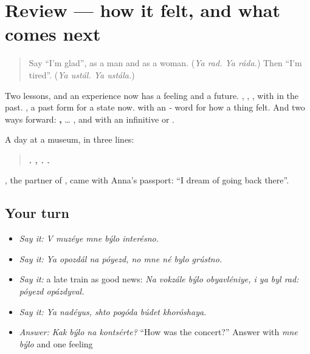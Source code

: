 \section[(review)]{Review — how it felt, and what comes next}

\label{lesson:RU-C267-review}



\begin{quote}
Say \textquotedblleft{}I'm glad\textquotedblright{}, as a man and as a woman. (\emph{Ya rad. Ya ráda.}) Then \textquotedblleft{}I'm tired\textquotedblright{}. (\emph{Ya ustál. Ya ustála.})
\end{quote}

\begin{grammarlens}[title={What you've built}]
Two lessons, and an experience now has a feeling and a future. \textbf{}, \textbf{}, \textbf{}, with \emph{} in the past. \textbf{ }, a past form for a state now. \textbf{ } with an \emph{-} word for how a thing felt. And two ways forward: \textbf{ , } … \emph{}, and \textbf{ } with an infinitive or \textbf{}.

A day at a museum, in three lines:

\begin{quote}
\textbf{    .   ,    .    .}
\end{quote}

\emph{}, the partner of \emph{}, came with Anna's passport: \textquotedblleft{}I dream of going back there\textquotedblright{}.
\end{grammarlens}

\subsection*{Your turn}
\begin{itemize}
\raggedright
  \item \emph{Say it:} \emph{V muzéye mne býlo interésno.}
  \item \emph{Say it:} \emph{Ya opozdál na póyezd, no mne né bylo grústno.}
  \item \emph{Say it:} a late train as good news: \emph{Na vokzále býlo obyavléniye, i ya byl rad: póyezd opázdyval.}
  \item \emph{Say it:} \emph{Ya nadéyus, shto pogóda búdet khoróshaya.}
  \item \emph{Answer:} \emph{Kak býlo na kontsérte?} \textquotedblleft{}How was the concert?\textquotedblright{} Answer with \emph{mne býlo} and one feeling
\end{itemize}

